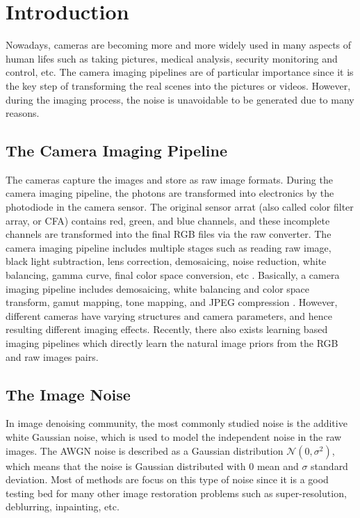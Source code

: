 %
\chapter{Introduction}
\label{sec:intro}



Nowadays, cameras are becoming more and more widely used in many aspects of human lifes such as taking pictures, medical analysis, security monitoring and control, etc. The camera imaging pipelines are of particular importance since it is the key step of transforming the real scenes into the pictures or videos. However, during the imaging process, the noise is unavoidable to be generated due to many reasons.

\section{The Camera Imaging Pipeline}
\label{sec:intro:general}

The cameras capture the images and store as raw image formats. During the camera imaging pipeline, the photons are transformed into electronics by the photodiode in the camera sensor. The original sensor arrat (also called color filter array, or CFA) contains red, green, and blue channels, and these incomplete channels are transformed into the final RGB files via the raw converter. The camera imaging pipeline includes multiple stages such as reading raw image, black light subtraction, lens correction, demosaicing, noise reduction, white balancing, gamma curve, final color space conversion, etc \cite{browneccv2016}. Basically, a camera imaging pipeline includes demosaicing, white balancing and color space transform, gamut mapping, tone mapping, and JPEG compression \cite{crosschannel}. However, different cameras have varying structures and camera parameters, and hence resulting different imaging effects. Recently, there also exists learning based imaging pipelines which directly learn the  natural image priors from the RGB and raw images pairs.


\section{The Image Noise}
\label{sec:intro:current}

In image denoising community, the most commonly studied noise is the additive white Gaussian noise, which is used to model the independent noise in the raw images. The AWGN noise is described as a Gaussian distribution $\mathcal{N}(0,\sigma^{2})$, which means that the noise is Gaussian distributed with $0$ mean and $\sigma$ standard deviation. Most of methods are focus on this type of noise since it is a good testing bed for many other image restoration problems such as super-resolution, deblurring, inpainting, etc.



